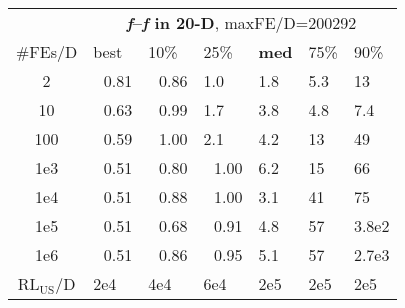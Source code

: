 \begin{tabular}{c|llllll}
 & \multicolumn{6}{|c}{\textbf{\textit{f}\raisebox{-0.35ex}{1}--\textit{f}\raisebox{-0.35ex}{24} in 20-D}, maxFE/D=200292}\\
\#FEs/D & best & 10\% & 25\% & \textbf{med} & 75\% & 90\%\\
2 & ~\,0.81 & ~\,0.86 & \hspace*{1ex}1.0 & \hspace*{1ex}1.8 & \hspace*{1ex}5.3 & 13\\
10 & ~\,0.63 & ~\,0.99 & \hspace*{1ex}1.7 & \hspace*{1ex}3.8 & \hspace*{1ex}4.8 & \hspace*{1ex}7.4\\
100 & ~\,0.59 & ~\,1.00 & \hspace*{1ex}2.1 & \hspace*{1ex}4.2 & 13 & 49\\
1e3 & ~\,0.51 & ~\,0.80 & ~\,1.00 & \hspace*{1ex}6.2 & 15 & 66\\
1e4 & ~\,0.51 & ~\,0.88 & ~\,1.00 & \hspace*{1ex}3.1 & 41 & 75\\
1e5 & ~\,0.51 & ~\,0.68 & ~\,0.91 & \hspace*{1ex}4.8 & 57 & 3.8e2\\
1e6 & ~\,0.51 & ~\,0.86 & ~\,0.95 & \hspace*{1ex}5.1 & 57 & 2.7e3\\
$\text{RL}_{\text{US}}$/D & 2e4 & 4e4 & 6e4 & 2e5 & 2e5 & 2e5
\end{tabular}
